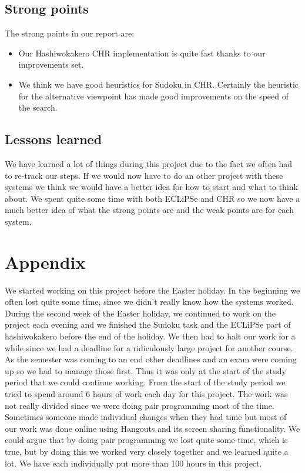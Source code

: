 \documentclass{report}
\newcommand{\mychapter}[2]{
    \setcounter{chapter}{#1}
    \setcounter{section}{0}
    \chapter*{#2}
    \addcontentsline{toc}{chapter}{#2}
}
\begin{document}
\section{Strong points}
The strong points in our report are:
\begin{itemize}
    \item Our Hashiwokakero CHR implementation is quite fast thanks to our improvements set.
    \item We think we have good heuristics for Sudoku in CHR. Certainly the heuristic for the alternative viewpoint has made good improvements on the speed of the search.
\end{itemize}

\section{Lessons learned}
We have learned a lot of things during this project due to the fact we often had to re-track our steps. If we would now have to do an other project with these systems we think we would have a better idea for how to start and what to think about. We spent quite some time with both ECLiPSe and CHR so we now have a much better idea of what the strong points are and the weak points are for each system.

\mychapter{4}{Appendix}
We started working on this project before the Easter holiday. In the beginning we often lost quite some time, since we didn't really know how the systems worked. During the second week of the Easter holiday, we continued to work on the project each evening and we finished the Sudoku task and the ECLiPSe part of hashiwokakero before the end of the holiday. We then had to halt our work for a while since we had a deadline for a ridiculously large project for another course. As the semester was coming to an end other deadlines and an exam were coming up so we had to manage those first. Thus it was only at the start of the study period that we could continue working. From the start of the study period we tried to spend around 6 hours of work each day for this project. The work was not really divided since we were doing pair programming most of the time. Sometimes someone made individual changes when they had time but most of our work was done online using Hangouts and its screen sharing functionality. We could argue that by doing pair programming we lost quite some time, which is true, but by doing this we worked very closely together and we learned quite a lot. We have each individually put more than 100 hours in this project.


\end{document}
